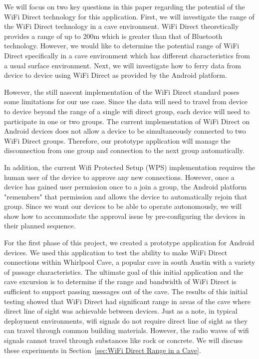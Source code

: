 \documentclass[10pt,twocolumn]{article}
\begin{document}
We will focus on two key questions in this paper regarding the potential of the WiFi Direct technology for this application.
First, we will investigate the range of the WiFi Direct technology in a cave environment.
WiFi Direct theoretically provides a range of up to 200m which is greater than that of Bluetooth technology. 
However, we would like to determine the potential range of WiFi Direct specifically in a cave environment which has different characteristics from a usual surface environment. 
Next, we will investigate how to ferry data from device to device using WiFi Direct as provided by the Android platform. 

However, the still nascent implementation of the WiFi Direct standard poses some limitations for our use case.
Since the data will need to travel from device to device beyond the range of a single wifi direct group, 
each device will need to participate in one or two groups. 
The current implementation of WiFi Direct on Android devices does not allow a device to be simultaneously connected to two WiFi Direct groups.
Therefore, our prototype application will manage the disconnection from one group and connection to the next group automatically.

In addition, the current Wifi Protected Setup (WPS) implementation requires the human user of the device to approve any new connections.
However, once a device has gained user permission once to a join a group, the Android platform "remembers" that permission and allows the device to automatically rejoin that group.
Since we want our devices to be able to operate autonomously, we will show how to accommodate the approval issue by pre-configuring the devices in their planned sequence.
 
For the first phase of this project, we created a prototype application for Android devices. 
We used this application to test the ability to make WiFi Direct connections within Whirlpool Cave, a popular cave in south Austin with a variety of passage characteristics. 
The ultimate goal of this initial application and the cave excursion is to determine if the range and bandwidth of WiFi Direct is sufficient to support passing messages out of the cave.
The results of this initial testing showed that WiFi Direct had significant range in areas of the cave where direct line of sight was achievable between devices.
Just as a note, in typical deployment environments, wifi signals do not require direct line of sight as they can travel through common building materials.
However, the radio waves of wifi signals cannot travel through substances like rock or concrete.
We will discuss these experiments in Section~\ref{sec:WiFi Direct Range in a Cave}.
\end{document}
